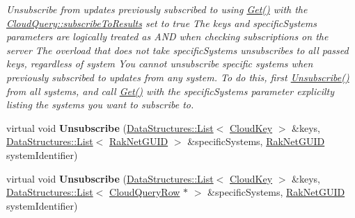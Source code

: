 \begin{DoxyCompactItemize}
\begin{DoxyCompactList}\small\item\em Unsubscribe from updates previously subscribed to using \hyperlink{class_rak_net_1_1_cloud_client_a97bcdfb7e824f979efa7491d3c837204}{Get()} with the \hyperlink{struct_rak_net_1_1_cloud_query_a7c8c441b2801141bbba54946cc9ee4f7}{Cloud\-Query\-::subscribe\-To\-Results} set to true The {\itshape keys} and {\itshape specific\-Systems} parameters are logically treated as A\-N\-D when checking subscriptions on the server The overload that does not take specific\-Systems unsubscribes to all passed keys, regardless of system You cannot unsubscribe specific systems when previously subscribed to updates from any system. To do this, first \hyperlink{class_rak_net_1_1_cloud_client_ab23db4329c42bc13c3fe6015ea83609c}{Unsubscribe()} from all systems, and call \hyperlink{class_rak_net_1_1_cloud_client_a97bcdfb7e824f979efa7491d3c837204}{Get()} with the {\itshape specific\-Systems} parameter explicilty listing the systems you want to subscribe to. \end{DoxyCompactList}\item 
\hypertarget{class_rak_net_1_1_cloud_client_ae7191e915d785682e9acb9166dc81afd}{virtual void {\bfseries Unsubscribe} (\hyperlink{class_data_structures_1_1_list}{Data\-Structures\-::\-List}$<$ \hyperlink{struct_rak_net_1_1_cloud_key}{Cloud\-Key} $>$ \&keys, \hyperlink{class_data_structures_1_1_list}{Data\-Structures\-::\-List}$<$ \hyperlink{struct_rak_net_1_1_rak_net_g_u_i_d}{Rak\-Net\-G\-U\-I\-D} $>$ \&specific\-Systems, \hyperlink{struct_rak_net_1_1_rak_net_g_u_i_d}{Rak\-Net\-G\-U\-I\-D} system\-Identifier)}\label{class_rak_net_1_1_cloud_client_ae7191e915d785682e9acb9166dc81afd}

\item 
\hypertarget{class_rak_net_1_1_cloud_client_a46fcdef478ce4c49305a1afab0ce5187}{virtual void {\bfseries Unsubscribe} (\hyperlink{class_data_structures_1_1_list}{Data\-Structures\-::\-List}$<$ \hyperlink{struct_rak_net_1_1_cloud_key}{Cloud\-Key} $>$ \&keys, \hyperlink{class_data_structures_1_1_list}{Data\-Structures\-::\-List}$<$ \hyperlink{struct_rak_net_1_1_cloud_query_row}{Cloud\-Query\-Row} $\ast$ $>$ \&specific\-Systems, \hyperlink{struct_rak_net_1_1_rak_net_g_u_i_d}{Rak\-Net\-G\-U\-I\-D} system\-Identifier)}\label{class_rak_net_1_1_cloud_client_a46fcdef478ce4c49305a1afab0ce5187}


\end{DoxyCompactItemize}
